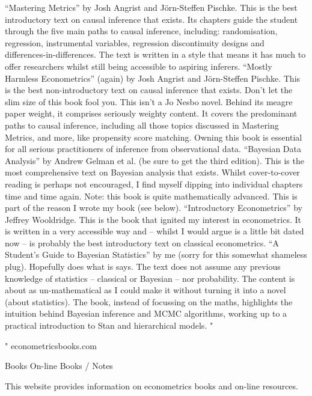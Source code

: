 “Mastering Metrics” by Josh Angrist and Jörn-Steffen Pischke. This is the best introductory text on causal inference that exists. Its chapters guide the student through the five main paths to causal inference, including: randomisation, regression, instrumental variables, regression discontinuity designs and differences-in-differences. The text is written in a style that means it has much to offer researchers whilst still being accessible to aspiring inferers.
“Mostly Harmless Econometrics” (again) by Josh Angrist and Jörn-Steffen Pischke. This is the best non-introductory text on causal inference that exists. Don’t let the slim size of this book fool you. This isn’t a Jo Nesbo novel. Behind its meagre paper weight, it comprises seriously weighty content. It covers the predominant paths to causal inference, including all those topics discussed in Mastering Metrics, and more, like propensity score matching. Owning this book is essential for all serious practitioners of inference from observational data.
“Bayesian Data Analysis” by Andrew Gelman et al. (be sure to get the third edition). This is the most comprehensive text on Bayesian analysis that exists. Whilst cover-to-cover reading is perhaps not encouraged, I find myself dipping into individual chapters time and time again. Note: this book is quite mathematically advanced. This is part of the reason I wrote my book (see below).
“Introductory Econometrics” by Jeffrey Wooldridge. This is the book that ignited my interest in econometrics. It is written in a very accessible way and – whilst I would argue is a little bit dated now – is probably the best introductory text on classical econometrics.
“A Student’s Guide to Bayesian Statistics” by me (sorry for this somewhat shameless plug). Hopefully does what is says. The text does not assume any previous knowledge of statistics – classical or Bayesian – nor probability. The content is about as un-mathematical as I could make it without turning it into a novel (about statistics). The book, instead of focussing on the maths, highlights the intuition behind Bayesian inference and MCMC algorithms, working up to a practical introduction to Stan and hierarchical models.
"

"
econometricsbooks.com
 

Books
On-line Books / Notes
 
This website provides information on econometrics books and on-line resources.

